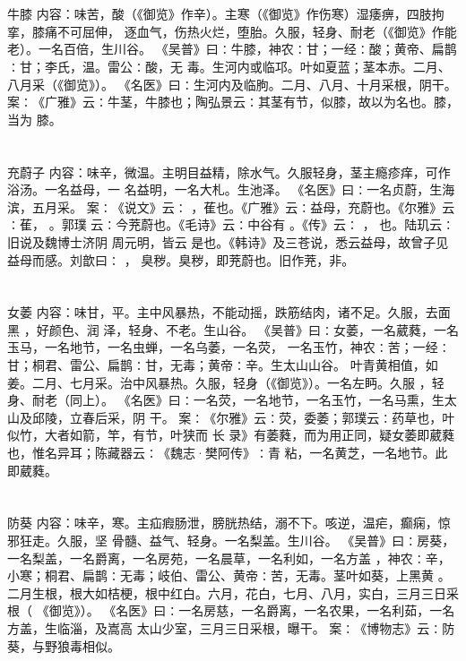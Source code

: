 \documentclass[12pt,UTF8]{ctexbook}
\begin{document}
\chapter{}牛膝
内容：味苦，酸（《御览》作辛）。主寒（《御览》作伤寒）湿痿痹，四肢拘挛，膝痛不可屈伸， 
逐血气，伤热火烂，堕胎。久服，轻身、耐老（《御览》作能老）。一名百倍，生川谷。 
《吴普》曰∶牛膝，神农∶甘；一经∶酸；黄帝、扁鹊∶甘；李氏，温。雷公∶酸，无 
毒。生河内或临邛。叶如夏蓝；茎本赤。二月、八月采（《御览》）。 
《名医》曰∶生河内及临朐。二月、八月、十月采根，阴干。 
案∶《广雅》云∶牛茎，牛膝也；陶弘景云∶其茎有节，似膝，故以为名也。膝，当为 
膝。 


\chapter{}充蔚子
内容：味辛，微温。主明目益精，除水气。久服轻身，茎主瘾疹痒，可作浴汤。一名益母，一 
名益明，一名大札。生池泽。 
《名医》曰∶一名贞蔚，生海滨，五月采。 
案∶《说文》云∶ ，萑也。《广雅》云∶益母，充蔚也。《尔雅》云∶萑， 。郭璞 
云∶今茺蔚也。《毛诗》云∶中谷有 。《传》云∶ ， 也。陆玑云∶旧说及魏博士济阴 
周元明，皆云 是也。《韩诗》及三苍说，悉云益母，故曾子见益母而感。刘歆曰∶ ， 
臭秽。臭秽，即茺蔚也。旧作茺，非。 


\chapter{}女萎
内容：味甘，平。主中风暴热，不能动摇，跌筋结肉，诸不足。久服，去面黑 ，好颜色、润 
泽，轻身、不老。生山谷。 
《吴普》曰∶女萎，一名葳蕤，一名玉马，一名地节，一名虫蝉，一名乌萎，一名荧， 
一名玉竹，神农∶苦；一经∶甘；桐君、雷公、扁鹊∶甘，无毒；黄帝∶辛。生太山山谷。 
叶青黄相值，如姜。二月、七月采。治中风暴热。久服，轻身（《御览》）。一名左眄。久服 
，轻身、耐老（同上）。 
《名医》曰∶一名荧，一名地节，一名玉竹，一名马熏，生太山及邱陵，立春后采，阴 
干。 
案∶《尔雅》云∶荧，委萎；郭璞云∶药草也，叶似竹，大者如箭，竿，有节，叶狭而 
长 
录》有萎蕤，而为用正同，疑女萎即葳蕤也，惟名异耳；陈藏器云∶《魏志·樊阿传》∶青 
粘，一名黄芝，一名地节。此即葳蕤。 


\chapter{}防葵
内容：味辛，寒。主疝瘕肠泄，膀胱热结，溺不下。咳逆，温疟，癫痫，惊邪狂走。久服，坚 
骨髓、益气、轻身。一名梨盖。生川谷。 
《吴普》曰∶房葵，一名梨盖，一名爵离，一名房苑，一名晨草，一名利如，一名方盖 
，神农∶辛，小寒；桐君、扁鹊∶无毒；岐伯、雷公、黄帝∶苦，无毒。茎叶如葵，上黑黄 
。二月生根，根大如桔梗，根中红白。六月，花白，七月、八月，实白，三月三日采根（ 
《御览》）。 
《名医》曰∶一名房慈，一名爵离，一名农果，一名利茹，一名方盖，生临淄，及嵩高 
太山少室，三月三日采根，曝干。 
案∶《博物志》云∶防葵，与野狼毒相似。 
\end{document}
